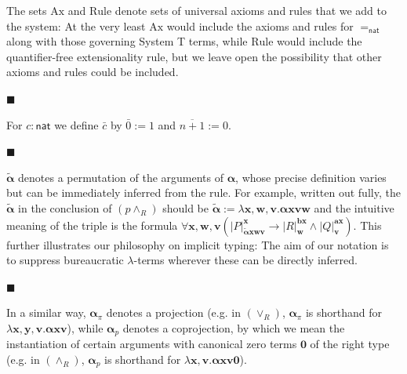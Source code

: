 \documentclass[10pt,a4paper]{article}
\begin{document}
The sets $\mathrm{Ax}$ and $\mathrm{Rule}$ denote sets of universal axioms and rules that we add to the system: At the very least $\mathrm{Ax}$ would include the axioms and rules for $=_{\mathsf{nat}}$ along with those governing System T terms, while $\mathrm{Rule}$ would include the quantifier-free extensionality rule, but we leave open the possibility that other axioms and rules could be included.\par
 
 
 
\par\noindent  $\blacksquare$ 
 
For $c:\mathsf{nat}$ we define $\bar{c}$ by $\bar{0}:=1$ and $\overline{n+1}:=0$.\par
 
 
 
\par\noindent  $\blacksquare$ 
 
$\tilde{\bm{\alpha}}$ denotes a permutation of the arguments of $\bm{\alpha}$, whose precise definition varies but can be immediately inferred from the rule. For example, written out fully, the $\tilde{\bm{\alpha}}$ in the conclusion of $(p\wedge_{R})$ should be $\tilde{\bm{\alpha}}:=\lambda\bm{x},\bm{w},\bm{v}.\bm{\alpha}\bm{x}\bm{v}\bm{w}$ and the intuitive meaning of the triple is the formula $\forall\bm{x},\bm{w},\bm{v}\left(|{P}|^{\bm{x}}_{\tilde{\bm{\alpha}}\bm{x}\bm{w}\bm{v}}\to|{R}|^{\bm{b}\bm{x}}_{\bm{w}}\wedge|{Q}|^{\bm{a}\bm{x}}_{\bm{v}}\right)$. This further illustrates our philosophy on implicit typing: The aim of our notation is to suppress bureaucratic $\lambda$-terms wherever these can be directly inferred.\par
 
 
 
\par\noindent  $\blacksquare$ 
 
In a similar way, $\bm{\alpha}_{\pi}$ denotes a projection (e.g. in $(\vee_{R})$, $\bm{\alpha}_{\pi}$ is shorthand for $\lambda\bm{x},\bm{y},\bm{v}.\bm{\alpha}\bm{x}\bm{v}$), while $\bm{\alpha}_{p}$ denotes a coprojection, by which we mean the instantiation of certain arguments with canonical zero terms $\bm{0}$ of the right type (e.g. in $(\wedge_{R})$, $\bm{\alpha}_{p}$ is shorthand for $\lambda\bm{x},\bm{v}.\bm{\alpha}\bm{x}\bm{v}\bm{0}$).\par
 
 
\end{document}
